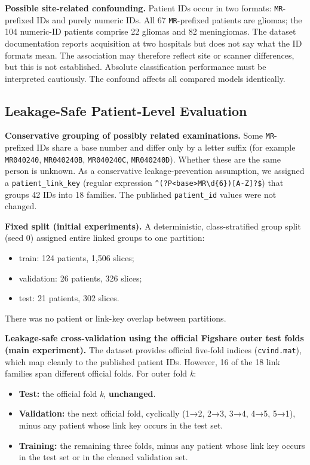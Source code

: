 \textbf{Possible site-related confounding.} Patient IDs occur in two formats: \texttt{MR}-prefixed IDs and purely numeric IDs. All 67 \texttt{MR}-prefixed patients are gliomas; the 104 numeric-ID patients comprise 22 gliomas and 82 meningiomas. The dataset documentation reports acquisition at two hospitals but does not say what the ID formats mean. The association may therefore reflect site or scanner differences, but this is not established. Absolute classification performance must be interpreted cautiously. The confound affects all compared models identically.

\subsection{Leakage-Safe Patient-Level Evaluation}

\textbf{Conservative grouping of possibly related examinations.} Some \texttt{MR}-prefixed IDs share a base number and differ only by a letter suffix (for example \texttt{MR040240}, \texttt{MR040240B}, \texttt{MR040240C}, \texttt{MR040240D}). Whether these are the same person is unknown. As a conservative leakage-prevention assumption, we assigned a \texttt{patient\_link\_key} (regular expression \texttt{\textasciicircum{}(?P<base>MR\textbackslash{}d\{6\})[A-Z]?\$}) that groups 42 IDs into 18 families. The published \texttt{patient\_id} values were not changed.

\textbf{Fixed split (initial experiments).} A deterministic, class-stratified group split (seed 0) assigned entire linked groups to one partition:

\begin{itemize}
\item train: 124 patients, 1,506 slices;
\item validation: 26 patients, 326 slices;
\item test: 21 patients, 302 slices.
\end{itemize}

There was no patient or link-key overlap between partitions.

\textbf{Leakage-safe cross-validation using the official Figshare outer test folds (main experiment).} The dataset provides official five-fold indices (\texttt{cvind.mat}), which map cleanly to the published patient IDs. However, 16 of the 18 link families span different official folds. For outer fold \emph{k}:

\begin{itemize}
\item \textbf{Test:} the official fold \emph{k}, \textbf{unchanged}.
\item \textbf{Validation:} the next official fold, cyclically (1→2, 2→3, 3→4, 4→5, 5→1), minus any patient whose link key occurs in the test set.
\item \textbf{Training:} the remaining three folds, minus any patient whose link key occurs in the test set or in the cleaned validation set.
\end{itemize}

